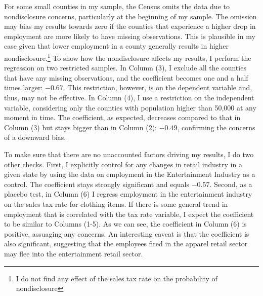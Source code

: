 \documentclass[12pt]{article}
\begin{document}
	For some small counties in my sample, the Census omits the data due to nondisclosure concerns, particularly at the beginning of my sample.  The omission may bias my results towards zero if the counties that experience a higher drop in employment are more likely to have missing observations. This is plausible in my case given that lower employment in a county generally results in higher nondisclosure.\footnote{I do not find any effect of the sales tax rate on the probability of nondisclosure} 
	To show how the nondisclosure affects my results, I perform the regression on two restricted samples. In Column (3), I exclude all the counties that have any missing observations, and the coefficient becomes one and a half times larger: $-0.67$. This restriction, however, is on the dependent variable and, thus, may not be effective. In Column (4), I use a restriction on the independent variable, considering only the counties with population higher than 50,000 at any moment in time. The coefficient, as expected, decreases compared to that in Column (3) but stays bigger than in Column (2): $-0.49$, confirming the concerns of a downward bias.
	
	
	
	To make sure that there are no unaccounted factors driving my results, I do two other checks. First, I explicitly control for any changes in retail industry in a given state by using the data on employment in the Entertainment Industry as a control. The coefficient stays strongly significant and equals $-0.57$. Second, as a placebo test, in Column (6) I regress employment in the entertainment industry on the sales tax rate for clothing items. If there is some general trend in employment that is correlated with the tax rate variable, I expect the coefficient to be similar to Columns (1-5). As we can see, the coefficient in Column (6) is  positive, assuaging any concerns. An interesting caveat is that the coefficient is also significant, suggesting that the employees fired in the apparel retail sector may flee into the entertainment retail sector.
	
\end{document}
